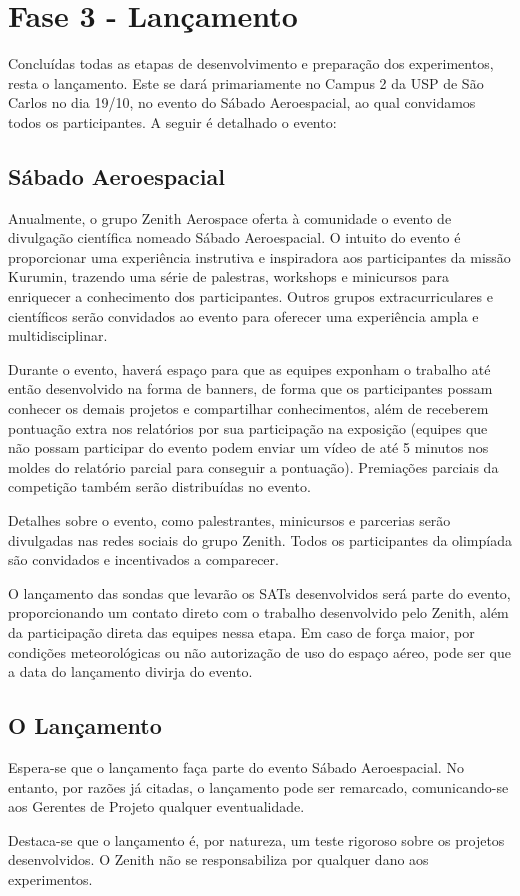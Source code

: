 \section{Fase 3 - Lançamento}
    Concluídas todas as etapas de desenvolvimento e preparação dos experimentos, resta o lançamento. Este se dará primariamente no Campus 2 da USP de São Carlos no dia 19/10, no evento do Sábado Aeroespacial, ao qual convidamos todos os participantes. A seguir é detalhado o evento:
        
    \subsection{Sábado Aeroespacial}
        Anualmente, o grupo Zenith Aerospace oferta à comunidade o evento de divulgação científica nomeado Sábado Aeroespacial. O intuito do evento é proporcionar uma experiência instrutiva e inspiradora aos participantes da missão Kurumin, trazendo uma série de palestras, workshops e minicursos para enriquecer a conhecimento dos participantes. Outros grupos extracurriculares e científicos serão convidados ao evento para oferecer uma experiência ampla e multidisciplinar.

        Durante o evento, haverá espaço para que as equipes exponham o trabalho até então desenvolvido na forma de banners, de forma que os participantes possam conhecer os demais projetos e compartilhar conhecimentos, além de receberem pontuação extra nos relatórios por sua participação na exposição (equipes que não possam participar do evento podem enviar um vídeo de até 5 minutos nos moldes do relatório parcial para conseguir a pontuação). Premiações parciais da competição também serão distribuídas no evento.
        
        Detalhes sobre o evento, como palestrantes, minicursos e parcerias serão divulgadas nas redes sociais do grupo Zenith. Todos os participantes da olimpíada são convidados e incentivados a comparecer.
        
        O lançamento das sondas que levarão os SATs desenvolvidos será parte do evento, proporcionando um contato direto com o trabalho desenvolvido pelo Zenith, além da participação direta das equipes nessa etapa. Em caso de força maior, por condições meteorológicas ou não autorização de uso do espaço aéreo, pode ser que a data do lançamento divirja do evento.

    \subsection{O Lançamento}
        Espera-se que o lançamento faça parte do evento Sábado Aeroespacial. No entanto, por razões já citadas, o lançamento pode ser remarcado, comunicando-se aos Gerentes de Projeto qualquer eventualidade.

        Destaca-se que o lançamento é, por natureza, um teste rigoroso sobre os projetos desenvolvidos. O Zenith não se responsabiliza por qualquer dano aos experimentos.